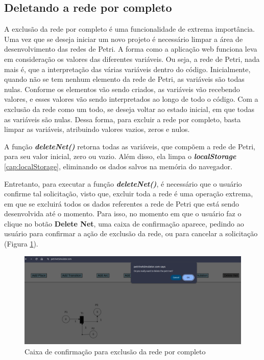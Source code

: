 \documentclass[
	12pt,				%
	openright,			%
	oneside,			%
	a4paper,			%
	english,			%
	brazil				%
	]{abntex2}
\theoremstyle{doispontos}
\begin{document}
\subsection{Deletando a rede por completo} \label{cap:deleteNetFull}

A exclusão da rede por completo é uma funcionalidade de extrema importância. Uma vez que se deseja iniciar um novo projeto é necessário limpar a área de desenvolvimento das redes de Petri. A forma como a aplicação web funciona leva em consideração os valores das diferentes variáveis. Ou seja, a rede de Petri, nada mais é, que a interpretação das várias variáveis dentro do código. Inicialmente, quando não se tem nenhum elemento da rede de Petri, as variáveis são todas nulas. Conforme os elementos vão sendo criados, as variáveis vão recebendo valores, e esses valores vão sendo interpretados ao longo de todo o código. Com a exclusão da rede como um todo, se deseja voltar ao estado inicial, em que todas as variáveis são nulas. Dessa forma, para excluir a rede por completo, basta limpar as variáveis, atribuindo valores vazios, zeros e nulos. 



A função \textbf{\textit{deleteNet()}} retorna todas as variáveis, que compõem a rede de Petri, para seu valor inicial, zero ou vazio. Além disso, ela limpa o \textbf{\textit{localStorage}} \ref{cap:localStorage}, eliminando os dados salvos na memória do navegador. 

Entretanto, para executar a função \textbf{\textit{deleteNet()}}, é necessário que o usuário confirme tal solicitação, visto que, excluir toda a rede é uma operação extrema, em que se excluirá todos os dados referentes a rede de Petri que está sendo desenvolvida até o momento. Para isso, no momento em que o usuário faz o clique no botão \textbf{Delete Net}, uma caixa de confirmação aparece, pedindo ao usuário para confirmar a ação de exclusão da rede, ou para cancelar a solicitação (Figura \ref{fig:confirmDeleteNet}). 

\begin{figure}[ht] 
	\centering
	\includegraphics[scale=0.4]{figuras/confirmDeleteNet.png}
	\caption[Caixa de confirmação para exclusão da rede por completo]{Caixa de confirmação para exclusão da rede por completo}
	\label{fig:confirmDeleteNet}
\end{figure}
\FloatBarrier
\end{document}
